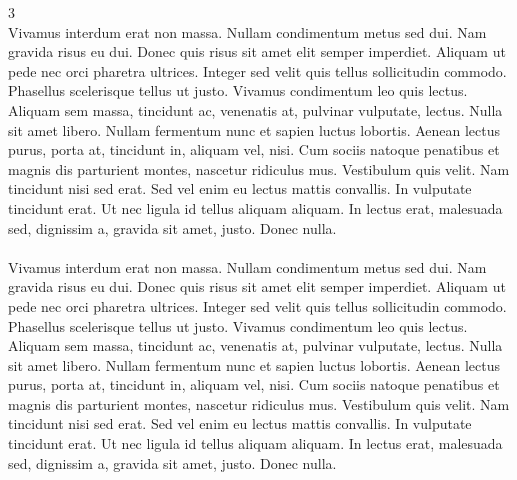 \documentclass[a0,final]{a0poster}
\begin{document}
\begin{multicols}{3}
\\
Vivamus interdum erat non massa. Nullam condimentum metus sed dui. Nam gravida risus eu dui. Donec quis risus sit amet elit semper imperdiet. Aliquam ut pede nec orci pharetra ultrices. Integer sed velit quis tellus sollicitudin commodo. Phasellus scelerisque tellus ut justo. Vivamus condimentum leo quis lectus. Aliquam sem massa, tincidunt ac, venenatis at, pulvinar vulputate, lectus. Nulla sit amet libero. Nullam fermentum nunc et sapien luctus lobortis. Aenean lectus purus, porta at, tincidunt in, aliquam vel, nisi. Cum sociis natoque penatibus et magnis dis parturient montes, nascetur ridiculus mus. Vestibulum quis velit. Nam tincidunt nisi sed erat. Sed vel enim eu lectus mattis convallis. In vulputate tincidunt erat. Ut nec ligula id tellus aliquam aliquam. In lectus erat, malesuada sed, dignissim a, gravida sit amet, justo. Donec nulla.\\
\\
Vivamus interdum erat non massa. Nullam condimentum metus sed dui. Nam gravida risus eu dui. Donec quis risus sit amet elit semper imperdiet. Aliquam ut pede nec orci pharetra ultrices. Integer sed velit quis tellus sollicitudin commodo. Phasellus scelerisque tellus ut justo. Vivamus condimentum leo quis lectus. Aliquam sem massa, tincidunt ac, venenatis at, pulvinar vulputate, lectus. Nulla sit amet libero. Nullam fermentum nunc et sapien luctus lobortis. Aenean lectus purus, porta at, tincidunt in, aliquam vel, nisi. Cum sociis natoque penatibus et magnis dis parturient montes, nascetur ridiculus mus. Vestibulum quis velit. Nam tincidunt nisi sed erat. Sed vel enim eu lectus mattis convallis. In vulputate tincidunt erat. Ut nec ligula id tellus aliquam aliquam. In lectus erat, malesuada sed, dignissim a, gravida sit amet, justo. Donec nulla.

\end{multicols}
\end{document}
